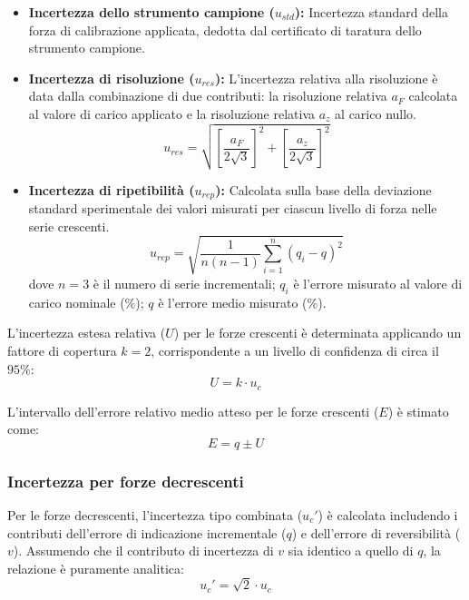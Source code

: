 \documentclass[a4paper, twoside]{article}
\begin{document}
\begin{itemize}
    \item \textbf{Incertezza dello strumento campione ($u_{std}$):} Incertezza standard della forza di calibrazione applicata, dedotta dal certificato di taratura dello strumento campione.
    \item \textbf{Incertezza di risoluzione ($u_{res}$):} L'incertezza relativa alla risoluzione è data dalla combinazione di due contributi: la risoluzione relativa $a_F$ calcolata al valore di carico applicato e la risoluzione relativa $a_z$ al carico nullo.
    \begin{equation}
         u_{res} = \sqrt{ \left[\frac{a_F}{2\sqrt{3}}\right]^2 + \left[\frac{a_z}{2\sqrt{3}}\right]^2 }   
    \end{equation}

    \item \textbf{Incertezza di ripetibilità ($u_{rep}$):} Calcolata sulla base della deviazione standard sperimentale dei valori misurati per ciascun livello di forza nelle serie crescenti.
    \begin{equation}
        u_{rep} = \sqrt{\frac{1}{n(n-1)} \sum_{i=1}^{n} (q_i - q)^2}
    \end{equation}
    dove $n=3$ è il numero di serie incrementali; $q_i$ è l'errore misurato al valore di carico nominale (\%); $q$ è l'errore medio misurato (\%).
\end{itemize}

L'incertezza estesa relativa ($U$) per le forze crescenti è determinata applicando un fattore di copertura $k=2$, corrispondente a un livello di confidenza di circa il $95\%$:
\begin{equation}
    U = k \cdot u_c
\end{equation}

L'intervallo dell'errore relativo medio atteso per le forze crescenti ($E$) è stimato come:
\begin{equation}
    E = q \pm U
\end{equation}

\subsubsection{Incertezza per forze decrescenti}
Per le forze decrescenti, l'incertezza tipo combinata ($u_c'$) è calcolata includendo i contributi dell'errore di indicazione incrementale ($q$) e dell'errore di reversibilità ($v$). Assumendo che il contributo di incertezza di $v$ sia identico a quello di $q$, la relazione è puramente analitica:
\begin{equation}
    u_c' = \sqrt{2} \cdot u_c
\end{equation}
\end{document}
